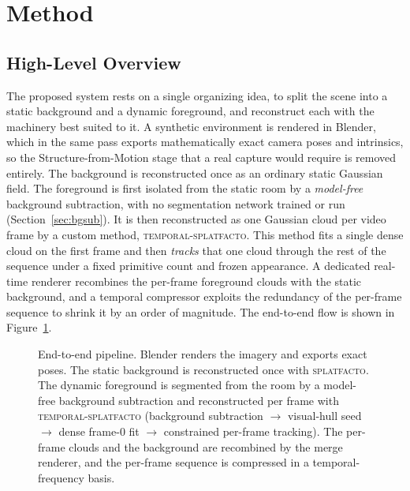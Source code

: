 \section{Method}

\subsection{High-Level Overview}
\label{sec:overview}

The proposed system rests on a single organizing idea, to split the scene into a
static background and a dynamic foreground, and reconstruct each with the machinery
best suited to it. A synthetic environment is rendered in Blender, which in the
same pass exports mathematically exact camera poses and intrinsics, so the
Structure-from-Motion stage that a real capture would require is removed entirely.
The background is reconstructed once as an ordinary static Gaussian field. The
foreground is first isolated from the static room by a \emph{model-free} background
subtraction, with no segmentation network trained or run (Section~\ref{sec:bgsub}).
It is then reconstructed as one Gaussian cloud per video frame by a custom method,
\textsc{temporal-splatfacto}. This method fits a single dense cloud on the first
frame and then \emph{tracks} that one cloud through the rest of the sequence under a
fixed primitive count and frozen appearance. A dedicated real-time renderer
recombines the per-frame foreground clouds with the static background, and a
temporal compressor exploits the redundancy of the per-frame sequence to shrink it
by an order of magnitude. The end-to-end flow is shown in
Figure~\ref{fig:pipeline}.

\begin{figure}[!ht]
    \centering
    \resizebox{\linewidth}{!}{}
    \caption{End-to-end pipeline. Blender renders the imagery and exports exact
    poses. The static background is reconstructed once with \textsc{splatfacto}.
    The dynamic foreground is segmented from the room by a model-free background
    subtraction and reconstructed per frame with
    \textsc{temporal-splatfacto} (background subtraction $\to$ visual-hull seed $\to$
    dense frame-0 fit $\to$ constrained per-frame tracking). The per-frame clouds and the background are
    recombined by the merge renderer, and the per-frame sequence is compressed in a
    temporal-frequency basis.}
    \label{fig:pipeline}
\end{figure}

